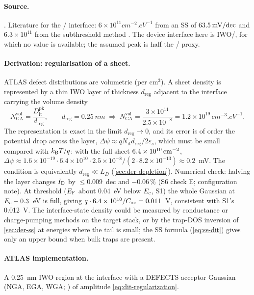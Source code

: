 \paragraph{Source.}
. Literature for the \HfO/\InO{} interface: $6\times10^{11}\si{cm^{-2}.eV^{-1}}$ from an SS of
63.5$\,\mathrm{mV/dec}$ \citep[p.~21539]{Lin2022} and $6.3\times10^{11}$ from the subthreshold method \citep[pp.~4--5]{Wang2022}.
The device interface here is IWO/\AlO, for which no value is available; the assumed peak is half the \HfO/\InO{}
proxy.

\paragraph{Derivation: regularisation of a sheet.}
ATLAS defect distributions are volumetric (per cm$^3$). A sheet density is represented by a thin IWO layer of
thickness $d_{\mathrm{reg}}$ adjacent to the interface carrying the volume density
\begin{equation}
  N_{\mathrm{GA}}^{\mathrm{vol}} = \frac{D_{\mathrm{it}}^{\mathrm{pk}}}{d_{\mathrm{reg}}},\qquad
  d_{\mathrm{reg}} = \SI{0.25}{nm}\;\Rightarrow\;
  N_{\mathrm{GA}}^{\mathrm{vol}} = \frac{3\times10^{11}}{2.5\times10^{-8}} = 1.2\times10^{19}\,\si{cm^{-3}.eV^{-1}}.
  \label{eq:dit-regularization}
\end{equation}
The representation is exact in the limit $d_{\mathrm{reg}}\rightarrow0$, and its error is of order the potential drop
across the layer, $\Delta\psi \approx q N_{\mathrm{it}} d_{\mathrm{reg}}/2\varepsilon_s$, which must be small compared
with $k_{\mathrm{B}}T/q$: with the full sheet $6.4\times10^{10}\,\mathrm{cm}^{-2}$, $\Delta\psi \approx 1.6\times10^{-19}\cdot6.4\times10^{10}\cdot2.5\times10^{-8}/(2\cdot8.2\times10^{-13})
\approx 0.2$~mV. The condition is equivalently $d_{\mathrm{reg}} \ll L_D$ (\cref{sec:der-depletion}). Numerical check:
halving the layer changes $I_{\mathrm{D}}$ by $\le 0.009$~dec and $-0.06$\,\% (S6 check E; configuration note). At threshold
($E_{\mathrm{F}}$ about 0.04~eV below $E_{\mathrm{c}}$, S1) the whole Gaussian at $E_{\mathrm{c}}-0.3$~eV is full, giving
$q\cdot6.4\times10^{10}/C_{\mathrm{ox}} = 0.011$~V, consistent with S1's 0.012~V.
The interface-state density could be measured by conductance or charge-pumping methods on the target stack, or by the trap-DOS
inversion of \cref{sec:der-ss} at energies where the tail is small; the SS formula (\cref{eq:ss-dit}) gives only an
upper bound when bulk traps are present.

\paragraph{ATLAS implementation.}
A 0.25~nm IWO region at the \AlO{} interface with a DEFECTS acceptor Gaussian (NGA, EGA, WGA;
\citealp[p.~1171]{AtlasManual}) of amplitude \cref{eq:dit-regularization}.

